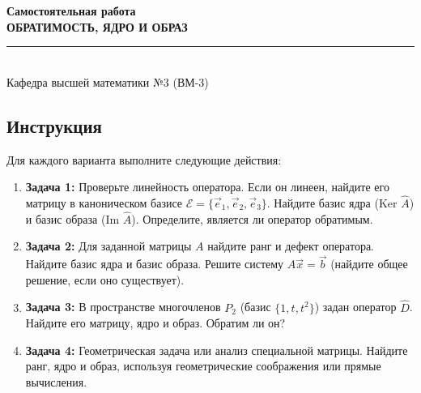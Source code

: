 \documentclass[12pt,a4paper]{article}
\theoremstyle{plain}
\theoremstyle{definition}
\begin{document}
\begin{center}
    \vspace{-0.5cm}
    {\Large\color{mireaMain}\textbf{Самостоятельная работа}} \\[0.3cm]
    {\Huge\color{mireaMain}\textbf{ОБРАТИМОСТЬ, ЯДРО И ОБРАЗ}} \\[0.3cm]
    \rule{0.4\textwidth}{1pt} \\[0.2cm]
    {\small Кафедра высшей математики №3 (ВМ-3)}
\end{center}

\vspace{0.2cm}

\begin{theorybox}
    \subsection*{Инструкция}
    Для каждого варианта выполните следующие действия:
    \begin{enumerate}
        \item \textbf{Задача 1:} Проверьте линейность оператора. Если он линеен, найдите его матрицу в каноническом базисе $\mathcal{E} = \{\vec{e}_1, \vec{e}_2, \vec{e}_3\}$. Найдите базис ядра ($\text{Ker } \hat{A}$) и базис образа ($\text{Im } \hat{A}$). Определите, является ли оператор обратимым.
        \item \textbf{Задача 2:} Для заданной матрицы $A$ найдите ранг и дефект оператора. Найдите базис ядра и базис образа. Решите систему $A\vec{x} = \vec{b}$ (найдите общее решение, если оно существует).
        \item \textbf{Задача 3:} В пространстве многочленов $P_2$ (базис $\{1, t, t^2\}$) задан оператор $\hat{D}$. Найдите его матрицу, ядро и образ. Обратим ли он?
        \item \textbf{Задача 4:} Геометрическая задача или анализ специальной матрицы. Найдите ранг, ядро и образ, используя геометрические соображения или прямые вычисления.
    \end{enumerate}
\end{theorybox}

\end{document}
